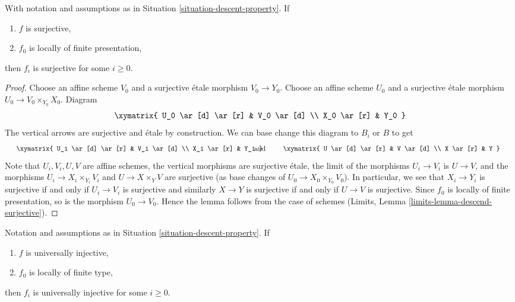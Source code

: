 \begin{lemma}
\label{lemma-descend-surjective}
With notation and assumptions as in
Situation \ref{situation-descent-property}. If
\begin{enumerate}
\item $f$ is surjective,
\item $f_0$ is locally of finite presentation,
\end{enumerate}
then $f_i$ is surjective for some $i \geq 0$.
\end{lemma}

\begin{proof}
Choose an affine scheme $V_0$ and a surjective \'etale morphism
$V_0 \to Y_0$. Choose an affine scheme $U_0$ and a surjective \'etale
morphism $U_0 \to V_0 \times_{Y_0} X_0$. Diagram
$$
\xymatrix{
U_0 \ar[d] \ar[r] & V_0 \ar[d] \\
X_0 \ar[r] & Y_0
}
$$
The vertical arrows are surjective and \'etale by construction.
We can base change this diagram to $B_i$ or $B$ to get
$$
\vcenter{
\xymatrix{
U_i \ar[d] \ar[r] & V_i \ar[d] \\
X_i \ar[r] & Y_i
}
}
\quad\text{and}\quad
\vcenter{
\xymatrix{
U \ar[d] \ar[r] & V \ar[d] \\
X \ar[r] & Y
}
}
$$
Note that $U_i, V_i, U, V$ are affine schemes, the vertical morphisms are
surjective \'etale, the limit of the morphisms $U_i \to V_i$ is $U \to V$,
and the morphisms $U_i \to X_i \times_{Y_i} V_i$ and
$U \to X \times_Y V$ are surjective (as base changes of
$U_0 \to X_0 \times_{Y_0} V_0$). In particular, we see that
$X_i \to Y_i$ is surjective if and only if $U_i \to V_i$ is surjective
and similarly $X \to Y$ is surjective if and only if $U \to V$ is surjective.
Since $f_0$ is locally of finite
presentation, so is the morphism $U_0 \to V_0$. Hence the lemma follows
from the case of schemes (Limits, Lemma \ref{limits-lemma-descend-surjective}).
\end{proof}

\begin{lemma}
\label{lemma-descend-universally-injective}
Notation and assumptions as in Situation \ref{situation-descent-property}. If
\begin{enumerate}
\item $f$ is universally injective,
\item $f_0$ is locally of finite type,
\end{enumerate}
then $f_i$ is universally injective for some $i \geq 0$.
\end{lemma}

